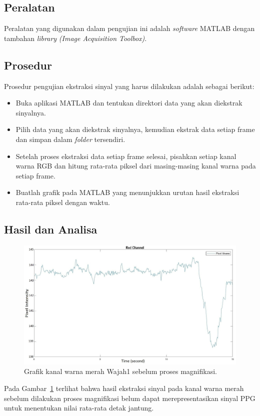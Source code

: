 \subsection{Peralatan}
Peralatan yang digunakan dalam pengujian ini adalah \textit{software} MATLAB dengan tambahan \textit{library} \textit{(Image Acquisition Toolbox)}.
\subsection{Prosedur}
Prosedur pengujian ekstraksi sinyal yang harus dilakukan adalah sebagai berikut:
\begin{itemize}
	\item Buka aplikasi MATLAB dan tentukan direktori data yang akan diekstrak sinyalnya.
	\item Pilih data yang akan diekstrak sinyalnya, kemudian ekstrak data setiap frame dan simpan dalam \textit{folder} tersendiri.
	\item Setelah proses ekstraksi data setiap frame selesai, pisahkan setiap kanal warna RGB dan hitung rata-rata piksel dari masing-masing kanal warna pada setiap frame.
	\item Buatlah grafik pada MATLAB yang menunjukkan urutan hasil ekstraksi rata-rata piksel dengan waktu.
\end{itemize}
\newpage
\subsection{Hasil dan Analisa}

\begin{figure}[ht]
	\vspace{0.5em}
	\centering
	\includegraphics[width=\textwidth,height=0.25\textheight]{Red_channel_wajah1-ori}
	\caption{Grafik kanal warna merah Wajah1 sebelum proses magnifikasi.}
	\label{fig:grafik-red-wajah1}   
\end{figure}
Pada Gambar~\ref{fig:grafik-red-wajah1} terlihat bahwa hasil ekstraksi sinyal pada kanal warna merah sebelum dilakukan proses magnifikasi belum dapat merepresentasikan sinyal PPG untuk menentukan nilai rata-rata detak jantung.

